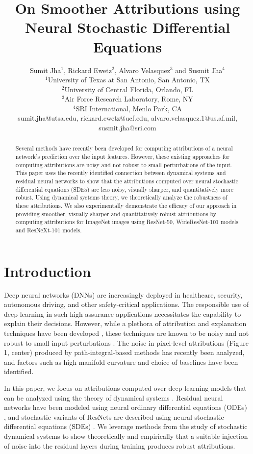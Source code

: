 \documentclass[10pt,twocolumn]{article}
\title{On Smoother Attributions using Neural Stochastic Differential Equations}
\author{
Sumit Jha$^1$, Rickard Ewetz$^2$, Alvaro Velasquez$^3$ and Susmit Jha$^4$ \\
$^1$University of Texas at San Antonio, San Antonio, TX \\
$^2$University of Central Florida, Orlando, FL \\
$^3$Air Force Research Laboratory, Rome, NY \\
$^4$SRI International, Menlo Park, CA \\
sumit.jha@utsa.edu, rickard.ewetz@ucf.edu, alvaro.velasquez.1@us.af.mil, susmit.jha@sri.com
}
\date{}
\begin{document}
\maketitle

\begin{abstract}
Several methods have recently been developed for computing attributions of a neural network's prediction over the input features. However, these existing approaches for computing attributions are noisy and not robust to small perturbations of the input. This paper uses the recently identified connection between dynamical systems and residual neural networks to show that the attributions computed over neural stochastic differential equations (SDEs) are less noisy, visually sharper, and quantitatively more robust. Using dynamical systems theory, we theoretically analyze the robustness of these attributions. We also experimentally demonstrate the efficacy of our approach in providing smoother, visually sharper and quantitatively robust attributions by computing attributions for ImageNet images using ResNet-50, WideResNet-101 models and ResNeXt-101 models.
\end{abstract}

\section{Introduction}
Deep neural networks (DNNs) are increasingly deployed in healthcare, security, autonomous driving, and other safety-critical applications. The responsible use of deep learning in such high-assurance applications necessitates the capability to explain their decisions. However, while a plethora of attribution and explanation techniques have been developed \cite{adebayo2018sanity}, these techniques are known to be noisy and not robust to small input perturbations \cite{adebayo2018sanity}. The noise in pixel-level attributions (Figure 1, center) produced by path-integral-based methods \cite{adebayo2018sanity} has recently been analyzed, and factors such as high manifold curvature and choice of baselines have been identified.

In this paper, we focus on attributions computed over deep learning models that can be analyzed using the theory of dynamical systems \cite{adebayo2018sanity}. Residual neural networks have been modeled using neural ordinary differential equations (ODEs) \cite{adebayo2018sanity}, and stochastic variants of ResNets are described using neural stochastic differential equations (SDEs) \cite{adebayo2018sanity}. We leverage methods from the study of stochastic dynamical systems to show theoretically and empirically that a suitable injection of noise into the residual layers during training produces robust attributions.
\end{document}
